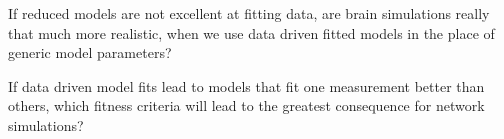 If reduced models are not excellent at fitting data, are brain simulations really that much more realistic, when we use data driven fitted models in the place of generic model parameters? 


If data driven model fits lead to models that fit one measurement better than others, which fitness criteria will lead to the greatest consequence for network simulations?







